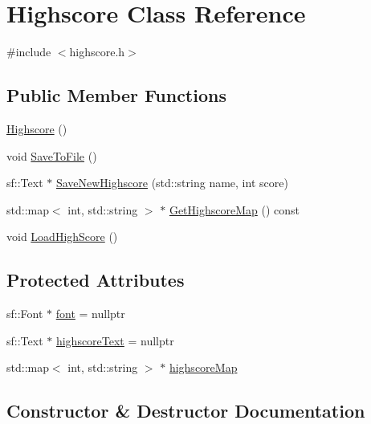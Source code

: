 \hypertarget{classHighscore}{}\section{Highscore Class Reference}
\label{classHighscore}


{\ttfamily \#include $<$highscore.\+h$>$}

\subsection*{Public Member Functions}
\begin{DoxyCompactItemize}
\item 
\hyperlink{classHighscore_a763df51b57887c8e68b6c09f4d5f27a5}{Highscore} ()
\item 
void \hyperlink{classHighscore_aa2a15102d554fd504d98ef7a378ea0aa}{Save\+To\+File} ()
\item 
sf\+::\+Text $\ast$ \hyperlink{classHighscore_a4b041465e4a5d91f5eba7ce9c911b66a}{Save\+New\+Highscore} (std\+::string name, int score)
\item 
std\+::map$<$ int, std\+::string $>$ $\ast$ \hyperlink{classHighscore_a12a65ff55b3f78e32c24a5948951f38e}{Get\+Highscore\+Map} () const 
\item 
void \hyperlink{classHighscore_a8b451de65e47425a47703729a9f50dbd}{Load\+High\+Score} ()
\end{DoxyCompactItemize}
\subsection*{Protected Attributes}
\begin{DoxyCompactItemize}
\item 
sf\+::\+Font $\ast$ \hyperlink{classHighscore_a40b7537ae183e56d521f8a1f5cfe0c87}{font} = nullptr
\item 
sf\+::\+Text $\ast$ \hyperlink{classHighscore_a4b09b1cd06d8344957beff965b809f38}{highscore\+Text} = nullptr
\item 
std\+::map$<$ int, std\+::string $>$ $\ast$ \hyperlink{classHighscore_a10c5bc666cbc80e11ddb6e09cb2a2696}{highscore\+Map}
\end{DoxyCompactItemize}


\subsection{Constructor \& Destructor Documentation}
